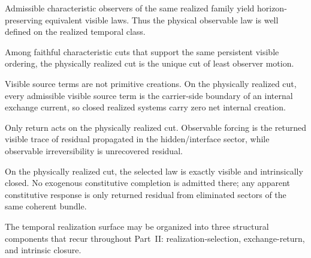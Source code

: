 \begin{tcolorbox}[colback=black!2, colframe=black!40, title={Operational form on the selected cut}]
\begin{description}[leftmargin=1.5em, itemsep=0.25em]
\item[Observer covariance.] Admissible characteristic observers of the same
      realized family yield horizon-preserving equivalent visible laws. Thus
      the physical observable law is well defined on the realized temporal
      class.
\item[Least-motion selection.] Among faithful characteristic cuts that support
      the same persistent visible ordering, the physically realized cut is the
      unique cut of least observer motion.
\item[Internal exchange balance.] Visible source terms are not primitive
      creations. On the physically realized cut, every admissible visible
      source term is the carrier-side boundary of an internal exchange current,
      so closed realized systems carry zero net internal creation.
\item[Residual return.] Only return acts on the physically realized cut.
      Observable forcing is the returned visible trace of residual propagated
      in the hidden/interface sector, while observable irreversibility is
      unrecovered residual.
\item[Self-sufficient closure.] On the physically realized cut, the selected
      law is exactly visible and intrinsically closed. No exogenous
      constitutive completion is admitted there; any apparent constitutive
      response is only returned residual from eliminated sectors of the same
      coherent bundle.
\end{description}
\end{tcolorbox}

\noindent
The temporal realization surface may be organized into three structural
components that recur throughout Part~II: realization-selection,
exchange-return, and intrinsic closure.


